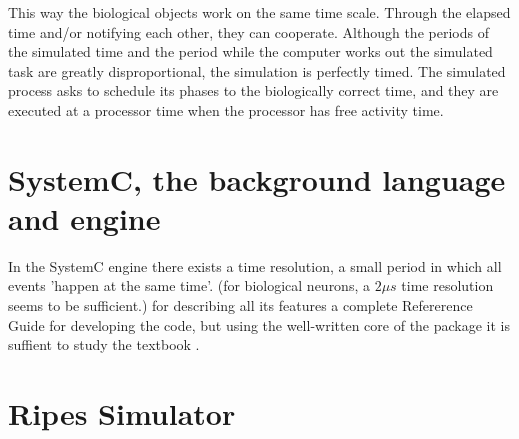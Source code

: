 This way the biological objects work on the same time scale. 
Through the elapsed time and/or notifying each other, they can cooperate. Although the periods of the simulated time and the
period while the computer works out the simulated task are greatly disproportional, the simulation is perfectly timed. The simulated process asks to schedule its phases to the biologically correct time, and they are executed at a processor time when the processor has free activity time.

%
\section{\label{sec:SIMULATION_SYSTEMC} SystemC, the background language and engine}

In the SystemC engine there exists a time resolution,
a small period in which all events 'happen at the same time'.
(for biological neurons, a $2 \mu s$ time resolution seems
to be sufficient.) for describing all its features a complete
Refererence Guide \cite{SystemChome:2017} for developing the  code, but using the well-written
core of the package it is suffient to study the textbook \cite{SystemCBook:2010}.


\section{Ripes Simulator \label{sec:Ripes_Simulator} }

